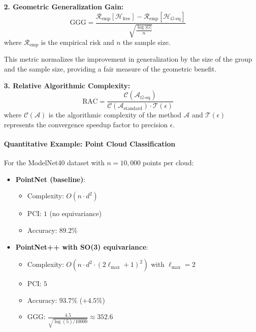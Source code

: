 \textbf{2. Geometric Generalization Gain:}
\begin{equation}
\text{GGG} = \frac{\mathcal{R}_{\text{emp}}[\mathcal{H}_{\text{free}}] - \mathcal{R}_{\text{emp}}[\mathcal{H}_{G\text{-eq}}]}{\sqrt{\frac{\log |G|}{n}}}
\end{equation}
where $\mathcal{R}_{\text{emp}}$ is the empirical risk and $n$ the sample size.

This metric normalizes the improvement in generalization by the size of the group and the sample size, providing a fair measure of the geometric benefit.

\textbf{3. Relative Algorithmic Complexity:}
\begin{equation}
\text{RAC} = \frac{\mathcal{C}(\mathcal{A}_{G\text{-eq}})}{\mathcal{C}(\mathcal{A}_{\text{standard}}) \cdot \mathcal{T}(\epsilon)}
\end{equation}
where $\mathcal{C}(\mathcal{A})$ is the algorithmic complexity of the method $\mathcal{A}$ and $\mathcal{T}(\epsilon)$ represents the convergence speedup factor to precision $\epsilon$.

\paragraph{Quantitative Example: Point Cloud Classification}

For the ModelNet40 dataset with $n = 10{,}000$ points per cloud:

\begin{itemize}
\item \textbf{PointNet (baseline)}:
  \begin{itemize}
  \item Complexity: $O(n \cdot d^2)$
  \item PCI: $1$ (no equivariance)
  \item Accuracy: $89.2\%$
  \end{itemize}

\item \textbf{PointNet++ with SO(3) equivariance}:
  \begin{itemize}
  \item Complexity: $O(n \cdot d^2 \cdot (2\ell_{\max} + 1)^2)$ with $\ell_{\max} = 2$
  \item PCI: $5$
  \item Accuracy: $93.7\%$ ($+4.5\%$)
  \item GGG: $\frac{4.5}{\sqrt{\log(5) / 10000}} \approx 352.6$
  \end{itemize}
\end{itemize}

